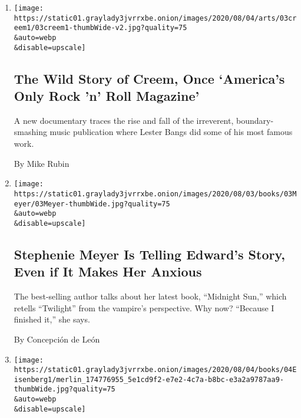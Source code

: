 \begin{enumerate}
\def\labelenumi{\arabic{enumi}.}
\item
  \href{/2020/08/03/arts/music/creem-magazine-documentary.html}{}

  \texttt{[image: https://static01.graylady3jvrrxbe.onion/images/2020/08/04/arts/03creem1/03creem1-thumbWide-v2.jpg?quality=75\\\&auto=webp\\\&disable=upscale]}

  \hypertarget{the-wild-story-of-creem-once-americas-only-rock-n-roll-magazine}{%
  \subsection{The Wild Story of Creem, Once `America's Only Rock 'n'
  Roll
  Magazine'}\label{the-wild-story-of-creem-once-americas-only-rock-n-roll-magazine}}

  A new documentary traces the rise and fall of the irreverent,
  boundary-smashing music publication where Lester Bangs did some of his
  most famous work.

  By Mike Rubin
\item
  \href{/2020/08/03/books/midnight-sun-stephenie-meyer-twilight.html}{}

  \texttt{[image: https://static01.graylady3jvrrxbe.onion/images/2020/08/03/books/03Meyer/03Meyer-thumbWide.jpg?quality=75\\\&auto=webp\\\&disable=upscale]}

  \hypertarget{stephenie-meyer-is-telling-edwards-story-even-if-it-makes-her-anxious}{%
  \subsection{Stephenie Meyer Is Telling Edward's Story, Even if It
  Makes Her
  Anxious}\label{stephenie-meyer-is-telling-edwards-story-even-if-it-makes-her-anxious}}

  The best-selling author talks about her latest book, ``Midnight Sun,''
  which retells ``Twilight'' from the vampire's perspective. Why now?
  ``Because I finished it,'' she says.

  By Concepción de León
\item
  \href{/2020/08/02/books/jesse-eisenberg-when-you-finish-saving-the-world-audio.html}{}

  \texttt{[image: https://static01.graylady3jvrrxbe.onion/images/2020/08/04/books/04Eisenberg1/merlin\_174776955\_5e1cd9f2-e7e2-4c7a-b8bc-e3a2a9787aa9-thumbWide.jpg?quality=75\\\&auto=webp\\\&disable=upscale]}

  \hypertarget{its-a-book-its-a-podcast-its-a-three-act-play-in-your-ears}{%
}
\end{enumerate}
